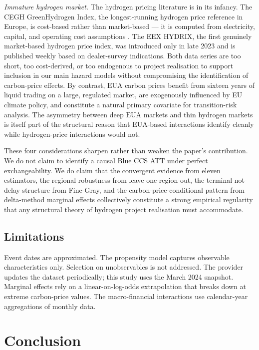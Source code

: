 \documentclass[review,authoryear,11pt]{elsarticle}
\newcommand{\BlueCCS}{\mathrm{Blue\_CCS}}
\newcommand{\EUA}{\mathrm{EUA}}
\begin{document}
\textit{Immature hydrogen market.} The hydrogen pricing literature is in its infancy. The CEGH GreenHydrogen Index, the longest-running hydrogen price reference in Europe, is cost-based rather than market-based --- it is computed from electricity, capital, and operating cost assumptions \citep{IEA2023}. The EEX HYDRIX, the first genuinely market-based hydrogen price index, was introduced only in late 2023 and is published weekly based on dealer-survey indications. Both data series are too short, too cost-derived, or too endogenous to project realisation to support inclusion in our main hazard models without compromising the identification of carbon-price effects. By contrast, $\EUA$ carbon prices benefit from sixteen years of liquid trading on a large, regulated market, are exogenously influenced by EU climate policy, and constitute a natural primary covariate for transition-risk analysis. The asymmetry between deep $\EUA$ markets and thin hydrogen markets is itself part of the structural reason that $\EUA$-based interactions identify cleanly while hydrogen-price interactions would not.

These four considerations sharpen rather than weaken the paper's contribution. We do not claim to identify a causal $\BlueCCS$ ATT under perfect exchangeability. We do claim that the convergent evidence from eleven estimators, the regional robustness from leave-one-region-out, the terminal-not-delay structure from Fine-Gray, and the carbon-price-conditional pattern from delta-method marginal effects collectively constitute a strong empirical regularity that any structural theory of hydrogen project realisation must accommodate.

\subsection{Limitations}

Event dates are approximated. The propensity model captures observable characteristics only. Selection on unobservables is not addressed. The provider updates the dataset periodically; this study uses the March 2024 snapshot. Marginal effects rely on a linear-on-log-odds extrapolation that breaks down at extreme carbon-price values. The macro-financial interactions use calendar-year aggregations of monthly data.

\section{Conclusion}
\end{document}
